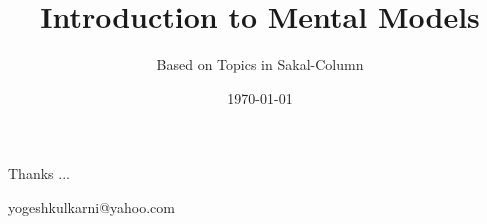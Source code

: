 \documentclass[xcolor=dvipsnames,compress,t,pdf]{beamer}
\title[\hspace{4cm} \insertframenumber /\inserttotalframenumber]
{Introduction to Mental Models}
\subtitle[]{Based on Topics in Sakal-Column}
\date[2020]{\today}
\begin{document}
\begin{frame}
\titlepage
\end{frame}


\begin{frame}[c]{}
Thanks ...

\vspace{5mm}
yogeshkulkarni@yahoo.com
\end{frame}
\end{document}
